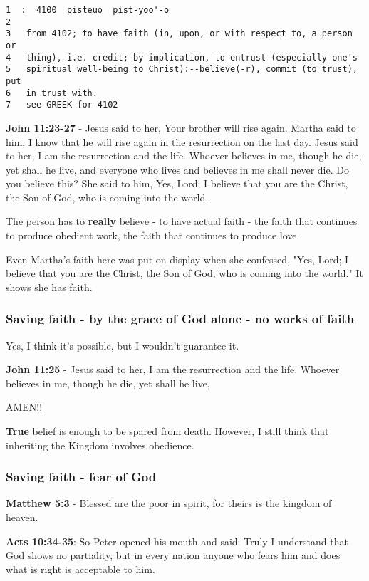 \documentclass[11pt]{article}
\begin{document}
\begin{verbatim}
1  :  4100  pisteuo  pist-yoo'-o
2  
3   from 4102; to have faith (in, upon, or with respect to, a person or
4   thing), i.e. credit; by implication, to entrust (especially one's
5   spiritual well-being to Christ):--believe(-r), commit (to trust), put
6   in trust with.
7   see GREEK for 4102
\end{verbatim}

\textbf{John 11:23-27} - Jesus said to her, Your brother will rise again.  Martha said to him, I know that he will rise again in the resurrection on the last day.  Jesus said to her, I am the resurrection and the life. Whoever believes in me, though he die, yet shall he live, and everyone who lives and believes in me shall never die. Do you believe this?  She said to him, Yes, Lord; I believe that you are the Christ, the Son of God, who is coming into the world.

The person has to \textbf{really} believe - to have actual faith - the faith that continues to produce obedient work, the faith that continues to produce love.

Even Martha's faith here was put on display when she confessed,
"Yes, Lord; I believe that you are the Christ, the Son of God, who is coming into the world."
It shows she has faith.

\subsubsection{Saving faith - by the grace of God alone - no works of faith}
\label{sec:org02ec5a1}
Yes, I think it's possible, but I wouldn't guarantee it.

\textbf{John 11:25} - Jesus said to her, I am the resurrection and the life. Whoever believes in me, though he die, yet shall he live,

AMEN!!

\textbf{True} belief is enough to be spared from death.
However, I still think that inheriting the Kingdom involves obedience.

\subsubsection{Saving faith - fear of God}
\label{sec:orgf2271cb}
\textbf{Matthew 5:3} - Blessed are the poor in spirit, for theirs is the kingdom of heaven.

\textbf{Acts 10:34-35}: So Peter opened his mouth and said: Truly I understand that God shows no partiality, but in every nation anyone who fears him and does what is right is acceptable to him.
\end{document}
